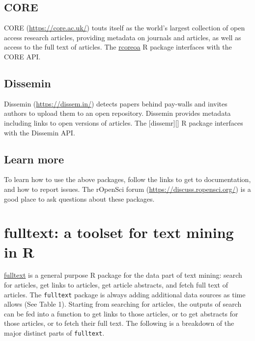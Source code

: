 \documentclass[author-year, review, 11pt]{components/elsarticle} %
\begin{document}
\hypertarget{core}{%
\subsection{CORE}\label{core}}

CORE (\url{https://core.ac.uk/}) touts itself as the world's largest
collection of open access research articles, providing metadata on
journals and articles, as well as access to the full text of articles.
The \href{https://github.com/ropensci/rcoreoa}{rcoreoa} R package
interfaces with the CORE API.

\hypertarget{dissemin}{%
\subsection{Dissemin}\label{dissemin}}

Dissemin (\url{https://dissem.in/}) detects papers behind pay-walls and
invites authors to upload them to an open repository. Dissemin provides
metadata including links to open versions of articles. The
{[}dissemr{]}{[}{]} R package interfaces with the Dissemin API.

\hypertarget{learn-more}{%
\subsection{Learn more}\label{learn-more}}

To learn how to use the above packages, follow the links to get to
documentation, and how to report issues. The rOpenSci forum
(\url{https://discuss.ropensci.org/}) is a good place to ask questions
about these packages.

\hypertarget{fulltext-a-toolset-for-text-mining-in-r}{%
\section{fulltext: a toolset for text mining in
R}\label{fulltext-a-toolset-for-text-mining-in-r}}

\href{https://github.com/ropensci/fulltext}{fulltext} is a general
purpose R package for the data part of text mining: search for articles,
get links to articles, get article abstracts, and fetch full text of
articles. The \texttt{fulltext} package is always adding additional data
sources as time allows (See Table 1). Starting from searching for
articles, the outputs of search can be fed into a function to get links
to those articles, or to get abstracts for those articles, or to fetch
their full text. The following is a breakdown of the major distinct
parts of \texttt{fulltext}.
\end{document}

